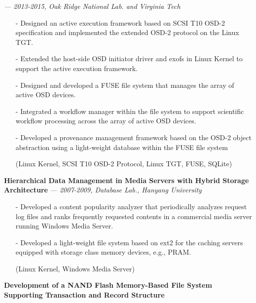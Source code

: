    {\it \footnotesize --- 2013-2015, Oak Ridge National Lab. and Virginia Tech}
    \begin{itemize}[leftmargin=*]
    \setlength\itemsep{-0.02in}
    \item[-] Designed an active execution framework based on SCSI T10 OSD-2 specification
             and implemented the extended OSD-2 protocol on the Linux TGT.
    \item[-] Extended the host-side OSD initiator driver and exofs in Linux Kernel
             to support the active execution framework.
    \item[-] Designed and developed a FUSE file system that manages
             the array of active OSD devices.
    \item[-] Integrated a workflow manager within the file system to support scientific
             workflow processing across the array of active OSD devices.
    \item[-] Developed a provenance management framework based on the OSD-2 object abstraction
             using a light-weight database within the FUSE file system
    \item[] {\small(Linux Kernel, SCSI T10 OSD-2 Protocol, Linux TGT, FUSE, SQLite)}
    \end{itemize}
  \vspace{-0.15in}
  {\bf Hierarchical Data Management in Media Servers with Hybrid Storage Architecture}
    {\it \footnotesize --- 2007-2009, Database Lab., Hanyang University}
    \begin{itemize}[leftmargin=*]
    \setlength\itemsep{-0.02in}
    \item[-] Developed a content popularity analyzer that periodically analyzes 
             request log files and ranks frequently requested contents
             in a commercial media server running Windows Media Server.
    \item[-] Developed a light-weight file system based on ext2
             for the caching servers equipped with 
             storage class memory devices, e.g., PRAM.
    \item[] {\small(Linux Kernel, Windows Media Server)}
    \end{itemize}
  \vspace{-0.15in}
  {\bf Development of a NAND Flash Memory-Based File System Supporting Transaction and
      Record Structure} 
